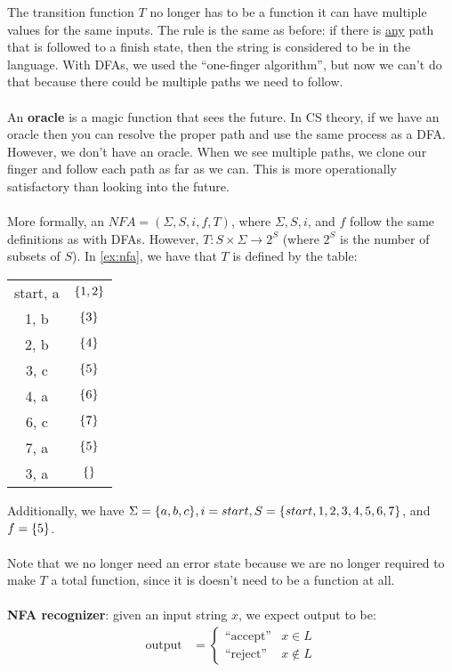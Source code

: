 \documentclass[]{article}
\DeclarePairedDelimiter{\set}{\lbrace}{\rbrace}
\theoremstyle{definition}
\begin{document}
			The transition function $T$ no longer has to be a function \textendash{} it can have multiple values for the same inputs.
			The rule is the same as before: if there is \underline{any} path that is followed to a finish state, then the string is considered to be in the language. With DFAs, we used the ``one-finger algorithm'', but now we can't do that because there could be multiple paths we need to follow.
			\\ \\
			An \textbf{oracle} is a magic function that sees the future. In CS theory, if we have an oracle then you can resolve the proper path and use the same process as a DFA. However, we don't have an oracle. When we see multiple paths, we clone our finger and follow each path as far as we can. This is more operationally satisfactory than looking into the future.
			\\ \\
			More formally, an $NFA = (\Sigma, S, i, f, T)$, where $\Sigma, S, i$, and $f$ follow the same definitions as with DFAs. However, $T: S \times \Sigma \to 2^S$ (where $2^S$ is the number of subsets of $S$). In \ref{ex:nfa}, we have that $T$ is defined by the table:
			\begin{center}
				\begin{tabular}{|c|c|}
					\hline
					start, a & $\set{1, 2}$ \\
					1, b & $\set{3}$ \\
					2, b & $\set{4}$ \\
					3, c & $\set{5}$ \\
					4, a & $\set{6}$ \\
					6, c & $\set{7}$ \\
					7, a & $\set{5}$ \\
					3, a & $\set{}$ \\ \hline
				\end{tabular}
			\end{center}
			Additionally, we have $\Sigma = \set{a, b, c}, i = start, S = \set{start, 1, 2, 3, 4, 5, 6, 7}$, and $f = \set{5}$.
			\\ \\
			Note that we no longer need an error state because we are no longer required to make $T$ a total function, since it is doesn't need to be a function at all. 
			\\ \\	
			\textbf{NFA recognizer}: given an input string $x$, we expect output to be:
			\begin{align*}
				\text{output} &= \begin{cases}
					\text{``accept''} & x \in L \\
					\text{``reject''} & x \not \in L
				\end{cases}
			\end{align*}
\end{document}
